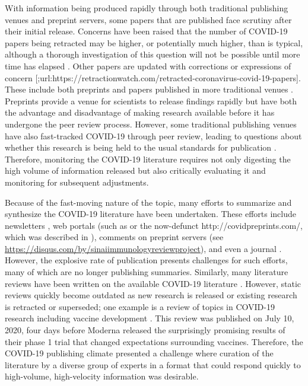 \documentclass[sigconf]{acmart}
\begin{document}
With information being produced rapidly through both traditional publishing venues and preprint servers, some papers that are published face scrutiny after their initial release.
Concerns have been raised that the number of COVID-19 papers being retracted may be higher, or potentially much higher, than is typical, although a thorough investigation of this question will not be possible until more time has elapsed \citep{ZUk10707, caxpZEmy}.
Other papers are updated with corrections or expressions of concern {[}\citet{caxpZEmy};url:https://retractionwatch.com/retracted-coronavirus-covid-19-papers{]}.
These include both preprints and papers published in more traditional venues \citep{hfAF6aDr, paRLhIdE}.
Preprints provide a venue for scientists to release findings rapidly but have both the advantage and disadvantage of making research available before it has undergone the peer review process.
However, some traditional publishing venues have also fast-tracked COVID-19 through peer review, leading to questions about whether this research is being held to the usual standards for publication \citep{1Dez1ZOc5}.
Therefore, monitoring the COVID-19 literature requires not only digesting the high volume of information released but also critically evaluating it and monitoring for subsequent adjustments.

Because of the fast-moving nature of the topic, many efforts to summarize and synthesize the COVID-19 literature have been undertaken.
These efforts include newsletters \citetext{\citealp{d204tUzq}; \citealp{JdWiPJCL}}, web portals (such as \citep{m4B8roc9, 1CBWvhTdy} or the now-defunct http://covidpreprints.com/, which was described in \citep{paRLhIdE}), comments on preprint servers \citep{YZ4cHNuH} (see \url{https://disqus.com/by/sinaiimmunologyreviewproject}), and even a journal \citep{oBoqEGzZ}.
However, the explosive rate of publication presents challenges for such efforts, many of which are no longer publishing summaries.
Similarly, many literature reviews have been written on the available COVID-19 literature \citep{I2EsJmfs, 5x25saIz, evtsR3C5, 5x25saIz, 18eCxyLhx, SAE5ME3N, xOs5ctsW}.
However, static reviews quickly become outdated as new research is released or existing research is retracted or superseded; one example is a review of topics in COVID-19 research including vaccine development \citep{xOs5ctsW}.
This review was published on July 10, 2020, four days before Moderna released the surprisingly promising results of their phase 1 trial \citep{wiGjCZC8} that changed expectations surrounding vaccines.
Therefore, the COVID-19 publishing climate presented a challenge where curation of the literature by a diverse group of experts in a format that could respond quickly to high-volume, high-velocity information was desirable.
\end{document}
